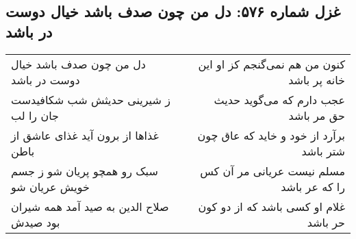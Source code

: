 \begin{center}
\section*{غزل شماره ۵۷۶: دل من چون صدف باشد خیال دوست در باشد}
\label{sec:0576}
\begin{longtable}{l p{0.5cm} r}
دل من چون صدف باشد خیال دوست در باشد
&&
کنون من هم نمی‌گنجم کز او این خانه پر باشد
\\
ز شیرینی حدیثش شب شکافیدست جان را لب
&&
عجب دارم که می‌گوید حدیث حق مر باشد
\\
غذاها از برون آید غذای عاشق از باطن
&&
برآرد از خود و خاید که عاق چون شتر باشد
\\
سبک رو همچو پریان شو ز جسم خویش عریان شو
&&
مسلم نیست عریانی مر آن کس را که عر باشد
\\
صلاح الدین به صید آمد همه شیران بود صیدش
&&
غلام او کسی باشد که از دو کون حر باشد
\\
\end{longtable}
\end{center}
